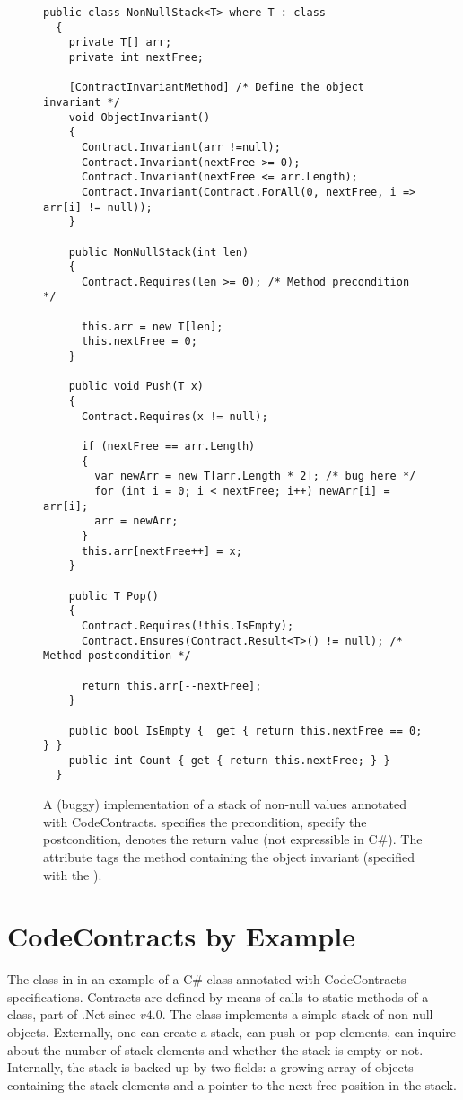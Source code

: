 \documentclass{llncs}
\begin{document}
\begin{figure}
\begin{lstlisting}
public class NonNullStack<T> where T : class
  {
    private T[] arr;
    private int nextFree;

    [ContractInvariantMethod] /* Define the object invariant */
    void ObjectInvariant()
    {
      Contract.Invariant(arr !=null);
      Contract.Invariant(nextFree >= 0);
      Contract.Invariant(nextFree <= arr.Length);
      Contract.Invariant(Contract.ForAll(0, nextFree, i => arr[i] != null));
    }

    public NonNullStack(int len)
    {
      Contract.Requires(len >= 0); /* Method precondition */

      this.arr = new T[len];
      this.nextFree = 0;
    }

    public void Push(T x)
    {
      Contract.Requires(x != null);

      if (nextFree == arr.Length)
      {
        var newArr = new T[arr.Length * 2]; /* bug here */
        for (int i = 0; i < nextFree; i++) newArr[i] = arr[i];
        arr = newArr;
      }
      this.arr[nextFree++] = x;
    }

    public T Pop()
    {
      Contract.Requires(!this.IsEmpty);
      Contract.Ensures(Contract.Result<T>() != null); /* Method postcondition */

      return this.arr[--nextFree];
    }

    public bool IsEmpty {  get { return this.nextFree == 0; } }
    public int Count { get { return this.nextFree; } }
  }
\end{lstlisting}

\caption{A (buggy) implementation of a stack of non-null values annotated with CodeContracts.
 specifies the precondition,   specify the postcondition,  denotes the return value (not expressible in C\#). 
The attribute  tags the method containing the object invariant (specified with the ).}
\label{fig:nonnullstack}
\end{figure}


\section{CodeContracts by  Example}
The class in  in an example of a C\# class
annotated with CodeContracts specifications.  Contracts are defined by
means of calls to static methods of a  class, part of
.Net since $v4.0$.  The class implements a simple stack of non-null
objects.  Externally, one can create a stack, can push or pop
elements, can inquire about the number of stack elements and whether
the stack is empty or not.  Internally, the stack is backed-up by two
fields: a growing array of objects containing the stack elements and a
pointer to the next free position in the stack.
\end{document}
